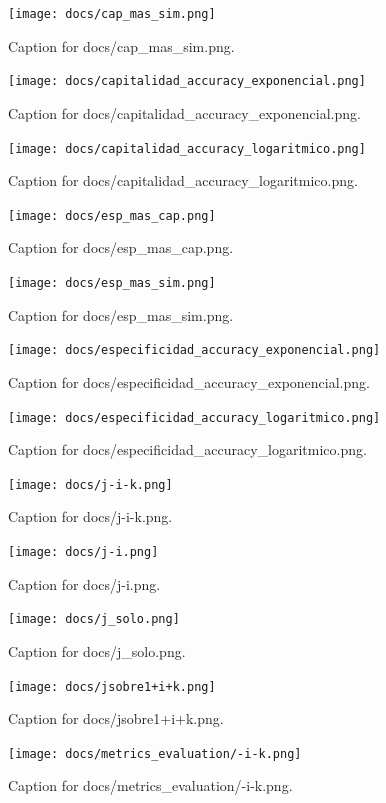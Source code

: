 \documentclass{article}
\begin{document}
\begin{figure}[h] \centering \texttt{[image: docs/cap\_mas\_sim.png]} \caption{Caption for docs/cap_mas_sim.png.} \end{figure}
\begin{figure}[h] \centering \texttt{[image: docs/capitalidad\_accuracy\_exponencial.png]} \caption{Caption for docs/capitalidad_accuracy_exponencial.png.} \end{figure}
\begin{figure}[h] \centering \texttt{[image: docs/capitalidad\_accuracy\_logaritmico.png]} \caption{Caption for docs/capitalidad_accuracy_logaritmico.png.} \end{figure}
\begin{figure}[h] \centering \texttt{[image: docs/esp\_mas\_cap.png]} \caption{Caption for docs/esp_mas_cap.png.} \end{figure}
\begin{figure}[h] \centering \texttt{[image: docs/esp\_mas\_sim.png]} \caption{Caption for docs/esp_mas_sim.png.} \end{figure}
\begin{figure}[h] \centering \texttt{[image: docs/especificidad\_accuracy\_exponencial.png]} \caption{Caption for docs/especificidad_accuracy_exponencial.png.} \end{figure}
\begin{figure}[h] \centering \texttt{[image: docs/especificidad\_accuracy\_logaritmico.png]} \caption{Caption for docs/especificidad_accuracy_logaritmico.png.} \end{figure}
\begin{figure}[h] \centering \texttt{[image: docs/j-i-k.png]} \caption{Caption for docs/j-i-k.png.} \end{figure}
\begin{figure}[h] \centering \texttt{[image: docs/j-i.png]} \caption{Caption for docs/j-i.png.} \end{figure}
\begin{figure}[h] \centering \texttt{[image: docs/j\_solo.png]} \caption{Caption for docs/j_solo.png.} \end{figure}
\begin{figure}[h] \centering \texttt{[image: docs/jsobre1+i+k.png]} \caption{Caption for docs/jsobre1+i+k.png.} \end{figure}
\begin{figure}[h] \centering \texttt{[image: docs/metrics\_evaluation/-i-k.png]} \caption{Caption for docs/metrics_evaluation/-i-k.png.} \end{figure}
\end{document}
